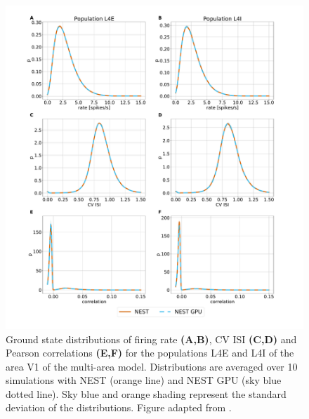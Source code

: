 \documentclass[a4paper, 12pt, twoside, openright]{book}
\begin{document}
\begin{figure}[H]
    \centering
    \includegraphics[trim=3cm 0 3cm 0, clip,width=\columnwidth]{figures/sample_gs.pdf}
    \caption{Ground state distributions of firing rate 
    \textbf{(A,B)}, CV ISI \textbf{(C,D)} and Pearson correlations \textbf{(E,F)} for the populations L4E and L4I of the area V1 of the multi-area model. Distributions are averaged over 10 simulations with NEST (orange line) and NEST GPU (sky blue dotted line). Sky blue and orange shading represent the standard deviation of the distributions. Figure adapted from \cite{Tiddia2022}.}
    \label{fig:sample_mam_gs}
\end{figure}
\end{document}
